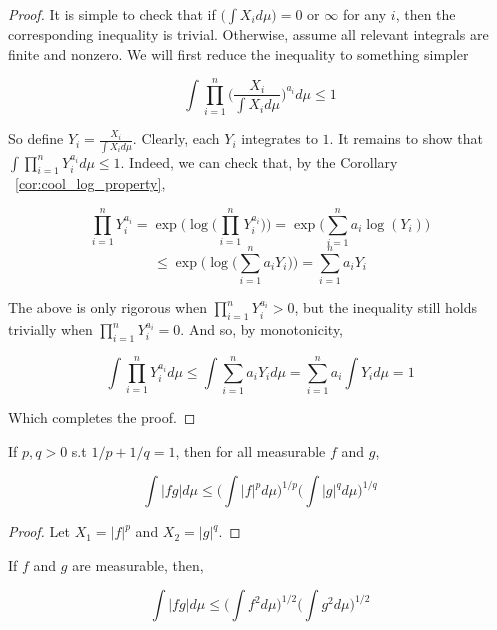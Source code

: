     \begin{proof}
        It is simple to check that if $\bigg(\int X_i d\mu \bigg) = 0$ or $\infty$ for any 
        $i$, then the corresponding inequality is trivial. Otherwise, assume all relevant integrals 
        are finite and nonzero. We will first reduce the inequality to something simpler

        \[ \int \prod_{i=1}^n \bigg(\frac{X_i}{\int X_i d\mu} \bigg)^{a_i}d\mu  \leq 1 \]

        So define $Y_i = \frac{X_i}{\int X_i d\mu}$. Clearly, each $Y_i$ integrates 
        to $1$. It remains to show that $\int \prod_{i=1}^n Y_i^{a_i} d\mu \leq 1$. Indeed, 
        we can check that, by the Corollary ~\ref{cor:cool_log_property},
        
        \[ \prod_{i=1}^n Y_i^{a_i} = \exp\bigg(\log\bigg(\prod_{i=1}^n Y_i^{a_i}\bigg) \bigg)= \exp\bigg( \sum_{i=1}^n a_i \log(Y_i) \bigg) \]
        \[ \leq \exp\bigg(\log\bigg(\sum_{i=1}^n a_i Y_i \bigg)\bigg) = \sum_{i=1}^n a_i Y_i \]

        The above is only rigorous when $\prod_{i=1}^n Y_i^{a_i} > 0$, but the inequality still 
        holds trivially when $\prod_{i=1}^n Y_i^{a_i} = 0$. And so, by 
        monotonicity, 

        \[ \int \prod_{i=1}^n Y_i^{a_i} d\mu \leq \int \sum_{i=1}^n a_i Y_i d\mu = \sum_{i=1}^n a_i \int Y_i d\mu = 1 \]

        Which completes the proof.

    \end{proof}

    \begin{corollary}
        If $p,q > 0$ s.t $1/p + 1/q = 1$, then for all measurable 
        $f$ and $g$, 

        \[ \int |fg|d\mu \leq \bigg( \int |f|^p  d\mu  \bigg)^{1/p}\bigg( \int |g|^q d\mu  \bigg)^{1/q} \]
    \end{corollary}

    \begin{proof}
        Let $X_1 = |f|^{p}$ and $X_2 = |g|^{q}$.
    \end{proof}

    \begin{corollary}
        If $f$ and $g$ are measurable, then, 

        \[ \int |fg|d\mu \leq \bigg( \int f^2  d\mu  \bigg)^{1/2}\bigg( \int g^2 d\mu  \bigg)^{1/2} \]

    \end{corollary}

